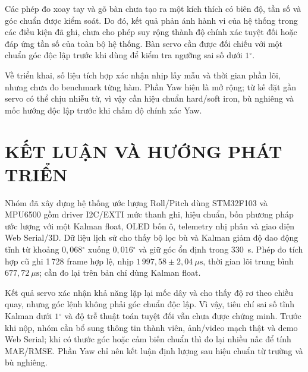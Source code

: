 \documentclass[14pt,a4paper,oneside]{extreport}
\newcommand{\degree}{\ensuremath{^{\circ}}}
\begin{document}
Các phép đo xoay tay và gõ bàn chưa tạo ra một kích thích có biên độ, tần số và góc chuẩn được kiểm soát. Do đó, kết quả phản ánh hành vi của hệ thống trong các điều kiện đã ghi, chưa cho phép suy rộng thành độ chính xác tuyệt đối hoặc đáp ứng tần số của toàn bộ hệ thống. Bàn servo cần được đối chiếu với một chuẩn góc độc lập trước khi dùng để kiểm tra ngưỡng sai số dưới $1\degree$.

Về triển khai, số liệu tích hợp xác nhận nhịp lấy mẫu và thời gian phần lõi, nhưng chưa đo benchmark từng hàm. Phần Yaw hiện là mở rộng; từ kế đặt gần servo có thể chịu nhiễu từ, vì vậy cần hiệu chuẩn hard/soft iron, bù nghiêng và mốc hướng độc lập trước khi chấm độ chính xác Yaw.







\chapter*{KẾT LUẬN VÀ HƯỚNG PHÁT TRIỂN}
Nhóm đã xây dựng hệ thống ước lượng Roll/Pitch dùng STM32F103 và MPU6500 gồm driver I2C/EXTI mức thanh ghi, hiệu chuẩn, bốn phương pháp ước lượng với một Kalman float, OLED bốn ô, telemetry nhị phân và giao diện Web Serial/3D. Dữ liệu lịch sử cho thấy bộ lọc bù và Kalman giảm độ dao động tĩnh từ khoảng $0{,}068\degree$ xuống $0{,}016\degree$ và giữ góc ổn định trong 330~s. Phép đo tích hợp cũ ghi 1\,728 frame hợp lệ, nhịp $1\,997{,}58\pm2{,}04~\mu\mathrm{s}$, thời gian lõi trung bình $677{,}72~\mu\mathrm{s}$; cần đo lại trên bản chỉ dùng Kalman float.

Kết quả servo xác nhận khả năng lặp lại mốc dây và cho thấy độ rơ theo chiều quay, nhưng góc lệnh không phải góc chuẩn độc lập. Vì vậy, tiêu chí sai số tĩnh Kalman dưới $1\degree$ và độ trễ thuật toán tuyệt đối vẫn chưa được chứng minh. Trước khi nộp, nhóm cần bổ sung thông tin thành viên, ảnh/video mạch thật và demo Web Serial; khi có thước góc hoặc cảm biến chuẩn thì đo lại nhiều nấc để tính MAE/RMSE. Phần Yaw chỉ nên kết luận định lượng sau hiệu chuẩn từ trường và bù nghiêng.
\end{document}
